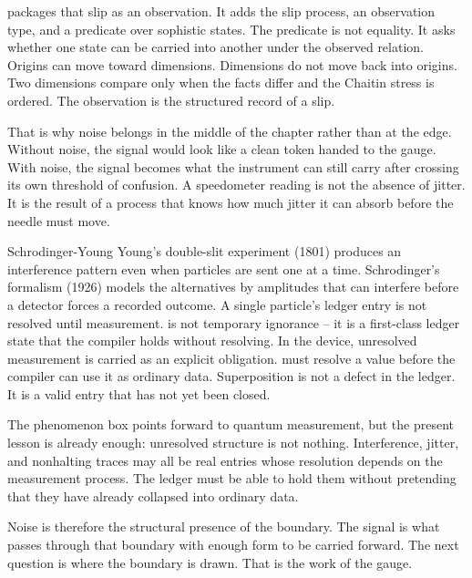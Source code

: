  packages that slip as an observation. It adds the slip process,
an observation type, and a predicate  over sophistic states. The
predicate is not equality. It asks whether one state can be carried into
another under the observed relation. Origins can move toward dimensions.
Dimensions do not move back into origins. Two dimensions compare only when the
facts differ and the Chaitin stress is ordered. The observation is the
structured record of a slip.

That is why noise belongs in the middle of the chapter rather than at the edge.
Without noise, the signal would look like a clean token handed to the gauge.
With noise, the signal becomes what the instrument can still carry after
crossing its own threshold of confusion. A speedometer reading is not the
absence of jitter. It is the result of a process that knows how much jitter it
can absorb before the needle must move.

\begin{gphenom}{Schrodinger-Young}
\label{ph:schrodinger-young}
\GPhObs Young's double-slit experiment (1801) produces an interference pattern
even when particles are sent one at a time. Schrodinger's formalism (1926)
models the alternatives by amplitudes that can interfere before a detector
forces a recorded outcome.
\GPhCon A single particle's ledger entry is not resolved until measurement.
 is not temporary ignorance -- it is a first-class
ledger state that the compiler holds without resolving.
\GPhSeq In the device, unresolved measurement is carried as an explicit
obligation.  must resolve a  value before the compiler
can use it as ordinary data. Superposition is not a defect in the ledger. It is
a valid entry that has not yet been closed.
\end{gphenom}

The phenomenon box points forward to quantum measurement, but the present
lesson is already enough: unresolved structure is not nothing. Interference,
jitter, and nonhalting traces may all be real entries whose resolution depends
on the measurement process. The ledger must be able to hold them without
pretending that they have already collapsed into ordinary data.

Noise is therefore the structural presence of the boundary. The signal is what
passes through that boundary with enough form to be carried forward. The next
question is where the boundary is drawn. That is the work of the gauge.

